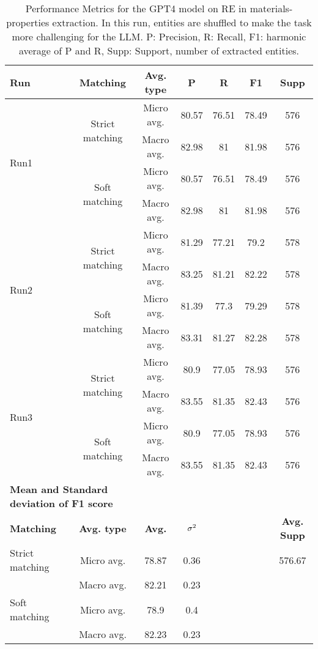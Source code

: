 
\begin{table}[htbp]
    \small
    \centering
    \caption{Performance Metrics for the GPT4 model on RE in materials-properties extraction. In this run, entities are shuffled to make the task more challenging for the LLM. P: Precision, R: Recall, F1: harmonic average of P and R, Supp: Support, number of extracted entities.}
    \begin{tabular}{lcccccc}
        \toprule
        \textbf{Run} & \textbf{Matching} & \textbf{Avg. type} & \textbf{P} & \textbf{R} & \textbf{F1} & \textbf{Supp} \\
        \midrule
        \multirow{4}{*}{Run1} & \multirow{2}{*}{Strict matching} & Micro avg. & 80.57 & 76.51 & 78.49 & 576 \\
        & & Macro avg. & 82.98 & 81 & 81.98 & 576 \\
        \cmidrule{2-7}
        & \multirow{2}{*}{Soft matching} & Micro avg. & 80.57 & 76.51 & 78.49 & 576 \\
        & & Macro avg. & 82.98 & 81 & 81.98 & 576 \\
        \midrule
        \multirow{4}{*}{Run2} & \multirow{2}{*}{Strict matching} & Micro avg. & 81.29 & 77.21 & 79.2 & 578 \\
        & & Macro avg. & 83.25 & 81.21 & 82.22 & 578 \\
        \cmidrule{2-7}
        & \multirow{2}{*}{Soft matching} & Micro avg. & 81.39 & 77.3 & 79.29 & 578 \\
        & & Macro avg. & 83.31 & 81.27 & 82.28 & 578 \\
        \midrule
        \multirow{4}{*}{Run3} & \multirow{2}{*}{Strict matching} & Micro avg. & 80.9 & 77.05 & 78.93 & 576 \\
        & & Macro avg. & 83.55 & 81.35 & 82.43 & 576 \\
        \cmidrule{2-7}
        & \multirow{2}{*}{Soft matching} & Micro avg. & 80.9 & 77.05 & 78.93 & 576 \\
        & & Macro avg. & 83.55 & 81.35 & 82.43 & 576 \\
        \midrule
        \multicolumn{2}{l}{\textbf{Mean and Standard deviation of F1 score}} & & & & & \\
        \midrule
        \textbf{Matching} & \textbf{Avg. type} & \textbf{Avg.} & $\sigma\textsuperscript{2}$ & & & \textbf{Avg. Supp}\\
        Strict matching & Micro avg. & 78.87 & 0.36 & & & 576.67 \\
        & Macro avg. & 82.21 & 0.23 & & & \\
        Soft matching & Micro avg. & 78.9 & 0.4 & & \\
        & Macro avg. & 82.23 & 0.23 & & \\
        \bottomrule
    \end{tabular}
\end{table}


